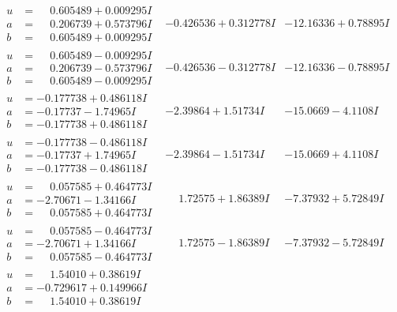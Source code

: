 \documentclass[1p]{elsarticle_modified}
\theoremstyle{definition}
\begin{document}
$$\begin{array}{c|c|c}
\begin{aligned}
u &= \phantom{-}0.605489 + 0.009295 I \\
a &= \phantom{-}0.206739 + 0.573796 I \\
b &= \phantom{-}0.605489 + 0.009295 I\end{aligned}
 & -0.426536 + 0.312778 I & -12.16336 + 0.78895 I \\ \hline\begin{aligned}
u &= \phantom{-}0.605489 - 0.009295 I \\
a &= \phantom{-}0.206739 - 0.573796 I \\
b &= \phantom{-}0.605489 - 0.009295 I\end{aligned}
 & -0.426536 - 0.312778 I & -12.16336 - 0.78895 I \\ \hline\begin{aligned}
u &= -0.177738 + 0.486118 I \\
a &= -0.17737 - 1.74965 I \\
b &= -0.177738 + 0.486118 I\end{aligned}
 & -2.39864 + 1.51734 I & -15.0669 - 4.1108 I \\ \hline\begin{aligned}
u &= -0.177738 - 0.486118 I \\
a &= -0.17737 + 1.74965 I \\
b &= -0.177738 - 0.486118 I\end{aligned}
 & -2.39864 - 1.51734 I & -15.0669 + 4.1108 I \\ \hline\begin{aligned}
u &= \phantom{-}0.057585 + 0.464773 I \\
a &= -2.70671 - 1.34166 I \\
b &= \phantom{-}0.057585 + 0.464773 I\end{aligned}
 & \phantom{-}1.72575 + 1.86389 I & -7.37932 + 5.72849 I \\ \hline\begin{aligned}
u &= \phantom{-}0.057585 - 0.464773 I \\
a &= -2.70671 + 1.34166 I \\
b &= \phantom{-}0.057585 - 0.464773 I\end{aligned}
 & \phantom{-}1.72575 - 1.86389 I & -7.37932 - 5.72849 I \\ \hline\begin{aligned}
u &= \phantom{-}1.54010 + 0.38619 I \\
a &= -0.729617 + 0.149966 I \\
b &= \phantom{-}1.54010 + 0.38619 I\end{aligned}

\end{array}$$
\end{document}
